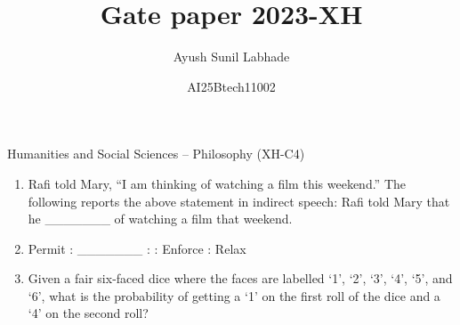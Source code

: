 \documentclass[12pt]{article}
\theoremstyle{remark}
\begin{document}
\title{\vspace{-5cm}Gate paper 2023-XH}
\author{Ayush Sunil Labhade}
\date{AI25Btech11002}
\maketitle

\begin{flushright}Humanities and Social Sciences – Philosophy (XH-C4)\end{flushright}
\begin{enumerate}
\item Rafi told Mary, “I am thinking of watching a film this weekend.”
The following reports the above statement in indirect speech: 
Rafi told Mary that he \_\_\_\_\_\_\_ of watching a film that weekend.
\begin{enumerate} 
\end{enumerate}
\hfill{}
\item Permit : \_\_\_\_\_\_\_ : : Enforce : Relax 
\begin{enumerate} 
\end{enumerate}
\hfill{}
\item Given a fair six-faced dice where the faces are labelled ‘1’, ‘2’, ‘3’, ‘4’, ‘5’, and ‘6’, 
what is the probability of getting a ‘1’ on the first roll of the dice and a ‘4’ on the 
second roll?
\begin{enumerate} 
    \begin{multicols}{4}

\end{multicols}
\end{enumerate}
\end{enumerate}
\end{document}
